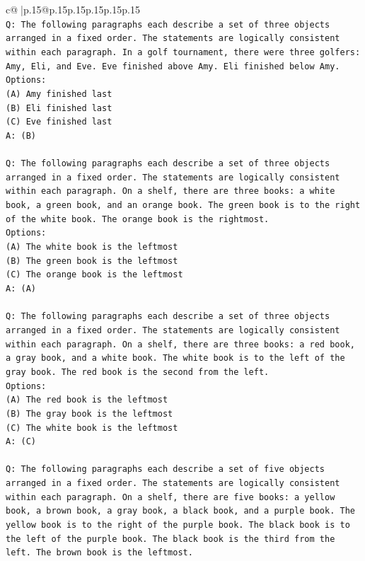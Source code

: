 \documentclass{article}
\begin{document}
{\begin{supertabular}{c@{$\;$}|p{.15\linewidth}@{}p{.15\linewidth}p{.15\linewidth}p{.15\linewidth}p{.15\linewidth}p{.15\linewidth}}
{{{\\ 
\texttt{Q: The following paragraphs each describe a set of three objects arranged in a fixed order. The statements are logically consistent within each paragraph. In a golf tournament, there were three golfers: Amy, Eli, and Eve. Eve finished above Amy. Eli finished below Amy.} \\
\texttt{Options:} \\
\texttt{(A) Amy finished last} \\
\texttt{(B) Eli finished last} \\
\texttt{(C) Eve finished last} \\
\texttt{A: (B)} \\
\\ 
\texttt{Q: The following paragraphs each describe a set of three objects arranged in a fixed order. The statements are logically consistent within each paragraph. On a shelf, there are three books: a white book, a green book, and an orange book. The green book is to the right of the white book. The orange book is the rightmost.} \\
\texttt{Options:} \\
\texttt{(A) The white book is the leftmost} \\
\texttt{(B) The green book is the leftmost} \\
\texttt{(C) The orange book is the leftmost} \\
\texttt{A: (A)} \\
\\ 
\texttt{Q: The following paragraphs each describe a set of three objects arranged in a fixed order. The statements are logically consistent within each paragraph. On a shelf, there are three books: a red book, a gray book, and a white book. The white book is to the left of the gray book. The red book is the second from the left.} \\
\texttt{Options:} \\
\texttt{(A) The red book is the leftmost} \\
\texttt{(B) The gray book is the leftmost} \\
\texttt{(C) The white book is the leftmost} \\
\texttt{A: (C)} \\
\\ 
\texttt{Q: The following paragraphs each describe a set of five objects arranged in a fixed order. The statements are logically consistent within each paragraph. On a shelf, there are five books: a yellow book, a brown book, a gray book, a black book, and a purple book. The yellow book is to the right of the purple book. The black book is to the left of the purple book. The black book is the third from the left. The brown book is the leftmost.} \\
}}}
\end{supertabular}}
\end{document}
